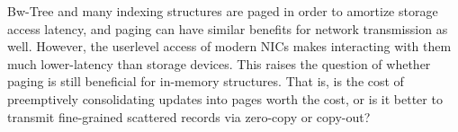 Bw-Tree and many indexing structures are paged in order to amortize storage
access latency, and paging can have similar benefits for network transmission
as well. However, the userlevel access of modern NICs makes interacting with
them much lower-latency than storage devices. This raises the question of
whether paging is still beneficial for in-memory structures. That is, is the
cost of preemptively consolidating updates into pages worth the cost, or is it
better to transmit fine-grained scattered records via zero-copy or copy-out?

%




